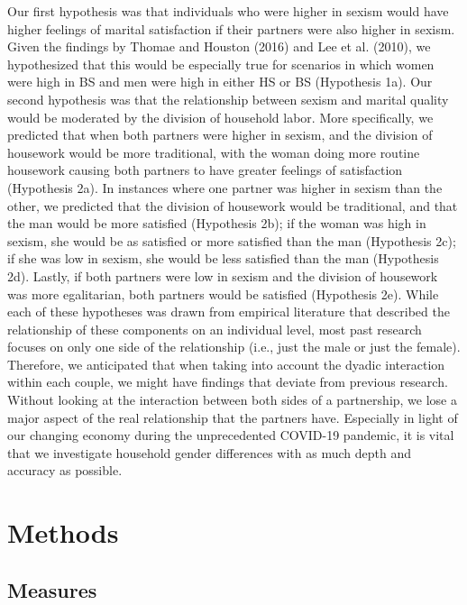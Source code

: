 \documentclass[
  english,
  man]{apa6}
\begin{document}
Our first hypothesis was that individuals who were higher in sexism would have higher feelings of marital satisfaction if their partners were also higher in sexism. Given the findings by Thomae and Houston (2016) and Lee et al. (2010), we hypothesized that this would be especially true for scenarios in which women were high in BS and men were high in either HS or BS (Hypothesis 1a). Our second hypothesis was that the relationship between sexism and marital quality would be moderated by the division of household labor. More specifically, we predicted that when both partners were higher in sexism, and the division of housework would be more traditional, with the woman doing more routine housework causing both partners to have greater feelings of satisfaction (Hypothesis 2a). In instances where one partner was higher in sexism than the other, we predicted that the division of housework would be traditional, and that the man would be more satisfied (Hypothesis 2b); if the woman was high in sexism, she would be as satisfied or more satisfied than the man (Hypothesis 2c); if she was low in sexism, she would be less satisfied than the man (Hypothesis 2d). Lastly, if both partners were low in sexism and the division of housework was more egalitarian, both partners would be satisfied (Hypothesis 2e). While each of these hypotheses was drawn from empirical literature that described the relationship of these components on an individual level, most past research focuses on only one side of the relationship (i.e., just the male or just the female). Therefore, we anticipated that when taking into account the dyadic interaction within each couple, we might have findings that deviate from previous research. Without looking at the interaction between both sides of a partnership, we lose a major aspect of the real relationship that the partners have. Especially in light of our changing economy during the unprecedented COVID-19 pandemic, it is vital that we investigate household gender differences with as much depth and accuracy as possible.

\hypertarget{methods}{%
\section{Methods}\label{methods}}

\hypertarget{measures}{%
\subsection{Measures}\label{measures}}
\end{document}
